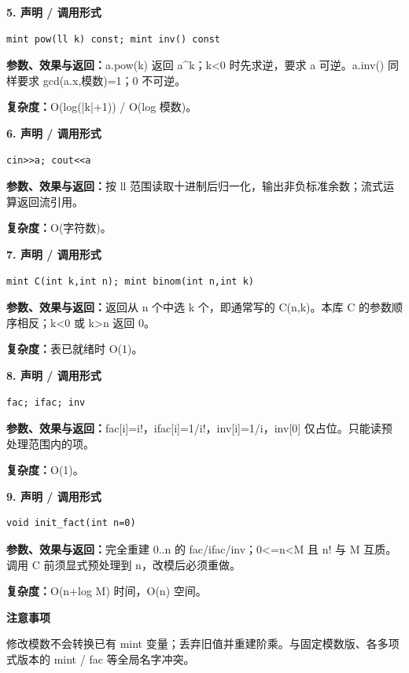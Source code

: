 \documentclass[UTF8,a4paper,10pt]{ctexart}
\newcommand{\TemplNote}[1]{\textbf{注意事项}\par #1\par}
\begin{document}
\noindent\begin{minipage}{\textwidth}
\textbf{5. 声明 / 调用形式}
\begin{lstlisting}
mint pow(ll k) const; mint inv() const
\end{lstlisting}
\textbf{参数、效果与返回：}a.pow(k) 返回 a\textasciicircum{}k；k<0 时先求逆，要求 a 可逆。a.inv() 同样要求 gcd(a.x,模数)=1；0 不可逆。

\textbf{复杂度：}O(log(|k|+1)) / O(log 模数)。

\end{minipage}\par\vspace{0.4em}
\noindent\begin{minipage}{\textwidth}
\textbf{6. 声明 / 调用形式}
\begin{lstlisting}
cin>>a; cout<<a
\end{lstlisting}
\textbf{参数、效果与返回：}按 ll 范围读取十进制后归一化，输出非负标准余数；流式运算返回流引用。

\textbf{复杂度：}O(字符数)。

\end{minipage}\par\vspace{0.4em}
\noindent\begin{minipage}{\textwidth}
\textbf{7. 声明 / 调用形式}
\begin{lstlisting}
mint C(int k,int n); mint binom(int n,int k)
\end{lstlisting}
\textbf{参数、效果与返回：}返回从 n 个中选 k 个，即通常写的 C(n,k)。本库 C 的参数顺序相反；k<0 或 k>n 返回 0。

\textbf{复杂度：}表已就绪时 O(1)。

\end{minipage}\par\vspace{0.4em}
\noindent\begin{minipage}{\textwidth}
\textbf{8. 声明 / 调用形式}
\begin{lstlisting}
fac; ifac; inv
\end{lstlisting}
\textbf{参数、效果与返回：}fac[i]=i!，ifac[i]=1/i!，inv[i]=1/i，inv[0] 仅占位。只能读预处理范围内的项。

\textbf{复杂度：}O(1)。

\end{minipage}\par\vspace{0.4em}
\noindent\begin{minipage}{\textwidth}
\textbf{9. 声明 / 调用形式}
\begin{lstlisting}
void init_fact(int n=0)
\end{lstlisting}
\textbf{参数、效果与返回：}完全重建 0..n 的 fac/ifac/inv；0<=n<M 且 n! 与 M 互质。调用 C 前须显式预处理到 n，改模后必须重做。

\textbf{复杂度：}O(n+log M) 时间，O(n) 空间。

\TemplNote{修改模数不会转换已有 mint 变量；丢弃旧值并重建阶乘。与固定模数版、各多项式版本的 mint / fac 等全局名字冲突。}
\end{minipage}\par\vspace{0.4em}
\clearpage
\end{document}

